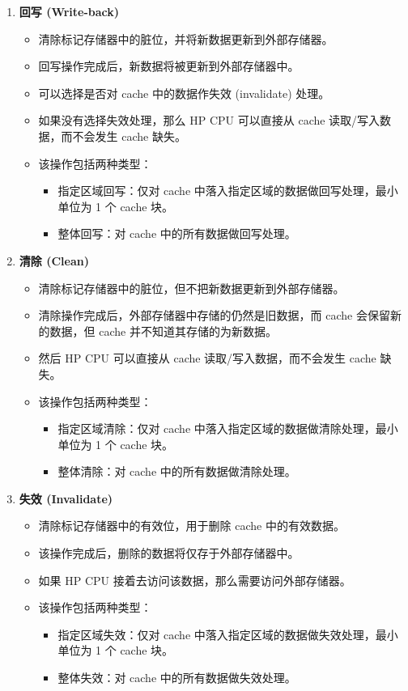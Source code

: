 \documentclass[main\_\_CN.tex]{subfiles}
\begin{document}
\begin{enumerate}
\item \textbf{回写 (Write-back)}
\begin{itemize}
    \item 清除标记存储器中的脏位，并将新数据更新到外部存储器。
    \item 回写操作完成后，新数据将被更新到外部存储器中。
    \item 可以选择是否对 cache 中的数据作失效 (invalidate) 处理。
    \item 如果没有选择失效处理，那么 HP CPU 可以直接从 cache 读取/写入数据，而不会发生 cache 缺失。
    \item 该操作包括两种类型：
    \begin{itemize}
    \item 指定区域回写：仅对 cache 中落入指定区域的数据做回写处理，最小单位为 1 个 cache 块。
    \item 整体回写：对 cache 中的所有数据做回写处理。
    \end{itemize}
\end{itemize}

\item \textbf{清除 (Clean)}
\begin{itemize}
    \item 清除标记存储器中的脏位，但不把新数据更新到外部存储器。
    \item 清除操作完成后，外部存储器中存储的仍然是旧数据，而 cache 会保留新的数据，但 cache 并不知道其存储的为新数据。
    \item 然后 HP CPU 可以直接从 cache 读取/写入数据，而不会发生 cache 缺失。
    \item 该操作包括两种类型：
    \begin{itemize}
    \item 指定区域清除：仅对 cache 中落入指定区域的数据做清除处理，最小单位为 1 个 cache 块。
    \item 整体清除：对 cache 中的所有数据做清除处理。
    \end{itemize}
\end{itemize}

\item \textbf{失效 (Invalidate)}
\begin{itemize}
    \item 清除标记存储器中的有效位，用于删除 cache 中的有效数据。
    \item 该操作完成后，删除的数据将仅存于外部存储器中。
    \item 如果 HP CPU 接着去访问该数据，那么需要访问外部存储器。
    \item 该操作包括两种类型：
    \begin{itemize}
    \item 指定区域失效：仅对 cache 中落入指定区域的数据做失效处理，最小单位为 1 个 cache 块。
    \item 整体失效：对 cache 中的所有数据做失效处理。
    \end{itemize}
\end{itemize}


\end{enumerate}
\end{document}
